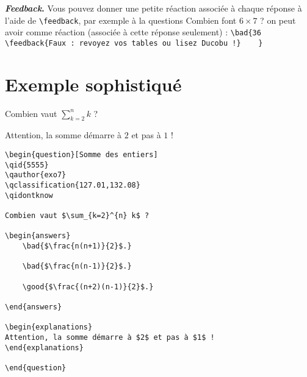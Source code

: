 \documentclass[12pt,a4paper]{article}
\begin{document}
\bigskip
\textbf{\emph{Feedback}.} Vous pouvez donner une petite réaction associée à chaque réponse à l'aide de \verb|\feedback|, par exemple à la questions \og{}Combien font $6\times 7$ ?\fg{} on peut avoir comme réaction (associée à cette réponse seulement) : 
\verb|\bad{36 \feedback{Faux : revoyez vos tables ou lisez Ducobu !}	}|



\section{Exemple sophistiqué}

\begin{center}
\begin{minipage}{0.8\textwidth}
\begin{question}
\qidontknow

Combien vaut $\sum_{k=2}^{n} k$ ?

\begin{answers}
    
    
\end{answers}

\begin{explanations}
Attention, la somme démarre à $2$ et pas à $1$ !
\end{explanations}

\end{question}
\end{minipage}
\end{center}

\begin{center}
\begin{minipage}{0.8\textwidth}
\begin{verbatim}
\begin{question}[Somme des entiers]
\qid{5555}
\qauthor{exo7}
\qclassification{127.01,132.08}
\qidontknow

Combien vaut $\sum_{k=2}^{n} k$ ?

\begin{answers}
    \bad{$\frac{n(n+1)}{2}$.}
    
    \bad{$\frac{n(n-1)}{2}$.} 
    
    \good{$\frac{(n+2)(n-1)}{2}$.}        

\end{answers}

\begin{explanations}
Attention, la somme démarre à $2$ et pas à $1$ !
\end{explanations}

\end{question}
\end{verbatim}
\end{minipage}
\end{center}
\end{document}
